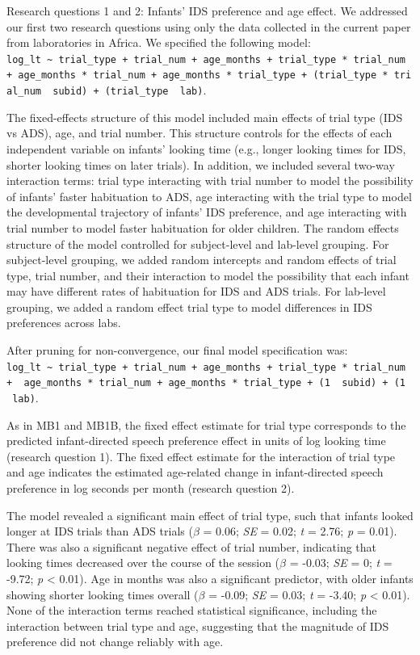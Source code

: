 \documentclass[
  ,man,floatsintext]{apa6}
\begin{document}
Research questions 1 and 2: Infants' IDS preference and age effect. We addressed our first two research questions using only the data collected in the current paper from laboratories in Africa. We specified the following model:
\texttt{log\_lt\ \textasciitilde{}\ trial\_type\ +\ trial\_num\ +\ age\_months\ +\ trial\_type\ *\ trial\_num\ +\ age\_months\ *\ trial\_num\ +\ age\_months\ *\ trial\_type\ +\ (trial\_type\ *\ trial\_num\ \textbar{}\ subid)\ +\ (trial\_type\ \textbar{}\ lab)}.

The fixed-effects structure of this model included main effects of trial type (IDS vs ADS), age, and trial number. This structure controls for the effects of each independent variable on infants' looking time (e.g., longer looking times for IDS, shorter looking times on later trials). In addition, we included several two-way interaction terms: trial type interacting with trial number to model the possibility of infants' faster habituation to ADS, age interacting with the trial type to model the developmental trajectory of infants' IDS preference, and age interacting with trial number to model faster habituation for older children. The random effects structure of the model controlled for subject-level and lab-level grouping. For subject-level grouping, we added random intercepts and random effects of trial type, trial number, and their interaction to model the possibility that each infant may have different rates of habituation for IDS and ADS trials. For lab-level grouping, we added a random effect trial type to model differences in IDS preferences across labs.

After pruning for non-convergence, our final model specification was: \texttt{log\_lt\ \textasciitilde{}\ trial\_type\ +\ trial\_num\ +\ age\_months\ +\ trial\_type\ *\ trial\_num\ +\ \ age\_months\ *\ trial\_num\ +\ age\_months\ *\ trial\_type\ +\ (1\ \textbar{}\ subid)\ +\ (1\ \textbar{}\ lab)}.

As in MB1 and MB1B, the fixed effect estimate for trial type corresponds to the predicted infant-directed speech preference effect in units of log looking time (research question 1). The fixed effect estimate for the interaction of trial type and age indicates the estimated age-related change in infant-directed speech preference in log seconds per month (research question 2).

The model revealed a significant main effect of trial type, such that infants looked longer at IDS trials than ADS trials (\emph{\(\beta\)} = 0.06; \emph{SE} = 0.02; \emph{t} = 2.76; \emph{p} = 0.01). There was also a significant negative effect of trial number, indicating that looking times decreased over the course of the session (\emph{\(\beta\)} = -0.03; \emph{SE} = 0; \emph{t} = -9.72; \emph{p} \textless{} 0.01). Age in months was also a significant predictor, with older infants showing shorter looking times overall (\emph{\(\beta\)} = -0.09; \emph{SE} = 0.03; \emph{t} = -3.40; \emph{p} \textless{} 0.01). None of the interaction terms reached statistical significance, including the interaction between trial type and age, suggesting that the magnitude of IDS preference did not change reliably with age.
\end{document}
